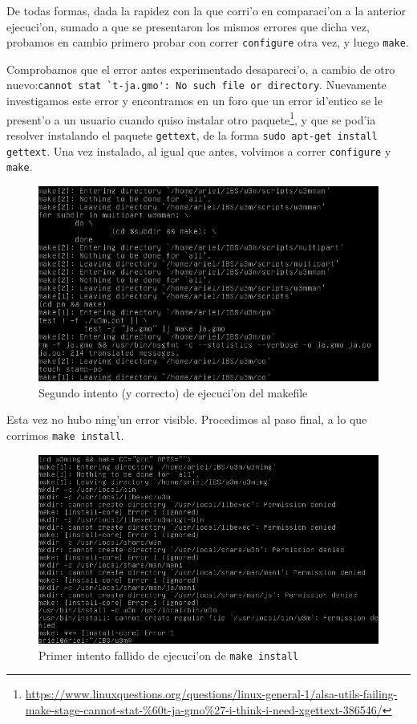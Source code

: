 \documentclass[11pt]{article}
\begin{document}
		De todas formas, dada la rapidez con la que corri'o en comparaci'on a la anterior ejecuci'on, sumado a que se presentaron los mismos errores que dicha vez, probamos en cambio primero probar con correr \texttt{configure} otra vez, y luego \texttt{make}.
		
		
		Comprobamos que el error antes experimentado desapareci'o, a cambio de otro nuevo:\enspace\verb|cannot stat `t-ja.gmo': No such file or directory|. Nuevamente investigamos este error y encontramos en un foro que un error id'entico se le present'o a un usuario cuando quiso instalar otro paquete\footnote{ \url{https://www.linuxquestions.org/questions/linux-general-1/alsa-utils-failing-make-stage-cannot-stat-\%60t-ja-gmo\%27-i-think-i-need-xgettext-386546/}}, y que se pod'ia resolver instalando el paquete \texttt{gettext}, de la forma \texttt{sudo apt-get install gettext}. Una vez instalado, al igual que antes, volvimos a correr \texttt{configure} y \texttt{make}.
		
		\begin{figure}[H]
			\centering \captionsetup{justification=centering}
			\includegraphics[width=.8\linewidth]{Images/Compile_w3m/make_successful}
			\caption{Segundo intento (y correcto) de ejecuci'on del makefile}
			\label{fig:make_successful}
		\end{figure}
		
		Esta vez no hubo ning'un error visible. Procedimos al paso final, a lo que corrimos \texttt{make install}.
		
		\begin{figure}[H]
			\centering \captionsetup{justification=centering}
			\includegraphics[width=.8\linewidth]{Images/Compile_w3m/make-install_fail}
			\caption{Primer intento fallido de ejecuci'on de \texttt{make install}}
			\label{fig:make-install_fail}
		\end{figure}
	
\end{document}
